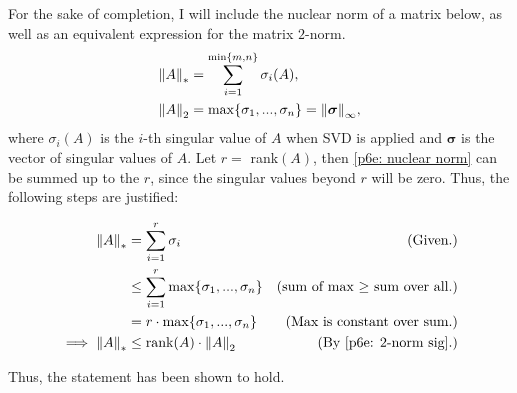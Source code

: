 \partbreak
\begin{solution}

    For the sake of completion, I will include the nuclear norm of a matrix below, as well as an equivalent expression for the matrix $2$-norm.
    \alignbreak
    \begin{align}
        \norm{A}_* &= \sum_{i = 1}^{\min\{m, n\}} \sigma_i(A) \label{p6e: nuclear norm},\\
        \norm{A}_2 &= \max \{ \sigma_1, ..., \sigma_n\} = \norm{\boldsymbol{\sigma}}_\infty, \label{p6e: 2-norm sig}
    \end{align}
    \alignbreak
    where $\sigma_i(A)$ is the $i$-th singular value of $A$ when SVD is applied and $\boldsymbol{\sigma}$ is the vector of singular values of $A$. Let $r = $ rank$(A)$, then \ref{p6e: nuclear norm} can be summed up to the $r$, since the singular values beyond $r$ will be zero. Thus, the following steps are justified:

    \alignbreak
    \begin{align}
        \norm{A}_* &= \sum_{i = 1}^r\sigma_i &\text{(Given.)}\nonumber\\
        &\leq \sum_{i = 1}^r \max\{ \sigma_1, ..., \sigma_n\} &\text{(sum of max $\geq$ sum over all.)}\nonumber\\
        &= r\cdot \max\{ \sigma_1, ..., \sigma_n\}&\text{(Max is constant over sum.)}\nonumber\\
        \implies \norm{A}_* &\leq \text{rank}(A) \cdot \norm{A}_2 &\text{(By \ref{p6e: 2-norm sig}.)}
    \end{align}
    \alignbreak

    Thus, the statement has been shown to hold. 
\end{solution}
